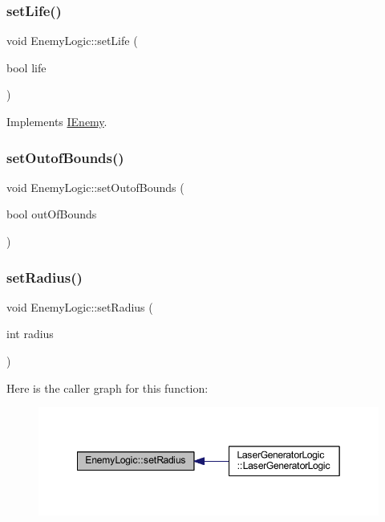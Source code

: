 \subsubsection{\texorpdfstring{set\+Life()}{setLife()}}
{\footnotesize\ttfamily void Enemy\+Logic\+::set\+Life (\begin{DoxyParamCaption}\item[{bool}]{life }\end{DoxyParamCaption})\hspace{0.3cm}{\ttfamily [virtual]}}



Implements \hyperlink{class_i_enemy_ab58f2f6c2a8c08730aaf8771f088e1bf}{I\+Enemy}.

\mbox{\label{class_enemy_logic_a0ac79ee7c0acf99b27aa4e22f98ce2d1}} 
\subsubsection{\texorpdfstring{set\+Outof\+Bounds()}{setOutofBounds()}}
{\footnotesize\ttfamily void Enemy\+Logic\+::set\+Outof\+Bounds (\begin{DoxyParamCaption}\item[{bool}]{out\+Of\+Bounds }\end{DoxyParamCaption})}

\mbox{\label{class_enemy_logic_acabb2cb226edc71300ba1f2bc3e7a577}} 
\subsubsection{\texorpdfstring{set\+Radius()}{setRadius()}}
{\footnotesize\ttfamily void Enemy\+Logic\+::set\+Radius (\begin{DoxyParamCaption}\item[{int}]{radius }\end{DoxyParamCaption})}

Here is the caller graph for this function\+:
\nopagebreak
\begin{figure}[H]
\begin{center}
\leavevmode
\includegraphics[width=349pt]{class_enemy_logic_acabb2cb226edc71300ba1f2bc3e7a577_icgraph}
\end{center}
\end{figure}


